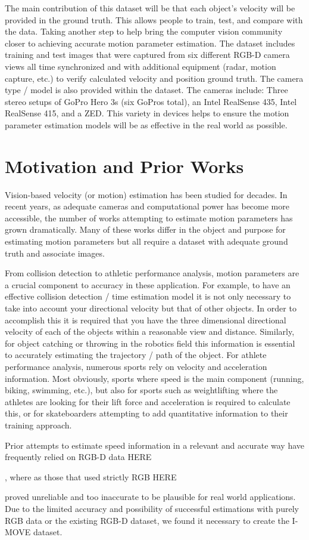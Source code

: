 The main contribution of this dataset will be that each object's velocity will be provided in the ground truth. 
This allows people to train, test, and compare with the data. 
Taking another step to help bring the computer vision community closer to achieving accurate motion parameter estimation. 
The dataset includes training and test images that were captured from six different RGB-D camera views all time synchronized and with additional equipment (radar, motion capture, etc.) to verify calculated velocity and position ground truth. 
The camera type / model is also provided within the dataset. 
The cameras include: Three stereo setups of GoPro Hero 3s (six GoPros total), an Intel RealSense 435, Intel RealSense 415, and a ZED. 
This variety in devices helps to ensure the motion parameter estimation models will be as effective in the real world as possible.


\section{Motivation and Prior Works}
Vision-based velocity (or motion) estimation has been studied for decades. 
In recent years, as adequate cameras and computational power has become more accessible, the number of works attempting to estimate motion parameters has grown dramatically. 
Many of these works differ in the object and purpose for estimating motion parameters but all require a dataset with adequate ground truth and associate images.

From collision detection to athletic performance analysis, motion parameters are a crucial component to accuracy in these application. 
For example, to have an effective collision detection / time estimation model it is not only necessary to take into account your directional velocity but that of other objects. 
In order to accomplish this it is required that you have the three dimensional directional velocity of each of the objects within a reasonable view and distance.
Similarly, for object catching or throwing in the robotics field this information is essential to accurately estimating the trajectory / path of the object. 
For athlete performance analysis, numerous sports rely on velocity and acceleration information. 
Most obviously, sports where speed is the main component (running, biking, swimming, etc.), but also for sports such as weightlifting where the athletes are looking for their lift force and acceleration is required to calculate this, or for skateboarders attempting to add quantitative information to their training approach.

Prior attempts to estimate speed information in a relevant and accurate way have frequently relied on RGB-D data HERE


, where as those that used strictly RGB HERE


proved unreliable and too inaccurate to be plausible for real world applications. Due to the limited accuracy and possibility of successful estimations with purely RGB data or the existing RGB-D dataset, we found it necessary to create the I-MOVE dataset.
